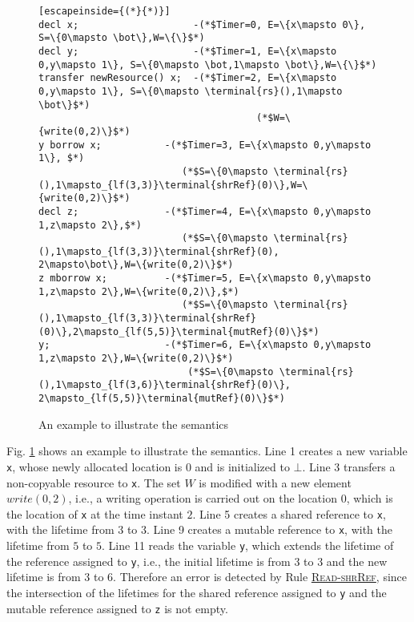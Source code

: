 \documentclass[runningheads]{llncs}
\def\refrule#1{\hyperref[#1]{\textsc{#1}}}
\def\codec#1{\texttt{#1}}
\newcommand{\terminal}[1]{\textbf{#1}}
\let\othelstnumber=\thelstnumber
\def\createlinenumber#1#2{
	\edef\thelstnumber{%
		\unexpanded{%
			\ifnum#1=\value{lstnumber}\relax
			#2%
			\else}%
		\expandafter\unexpanded\expandafter{\thelstnumber\othelstnumber\fi}%
	}
	\ifx\othelstnumber=\relax\else
	\let\othelstnumber\relax
	\fi
}
\begin{document}
\begin{figure}
	\vspace{-0.5cm}
\begin{lstlisting}[escapeinside={(*}{*)}]
decl x;                    -(*$Timer=0, E=\{x\mapsto 0\}, S=\{0\mapsto \bot\},W=\{\}$*)
decl y;	                   -(*$Timer=1, E=\{x\mapsto 0,y\mapsto 1\}, S=\{0\mapsto \bot,1\mapsto \bot\},W=\{\}$*)
transfer newResource() x;  -(*$Timer=2, E=\{x\mapsto 0,y\mapsto 1\}, S=\{0\mapsto \terminal{rs}(),1\mapsto \bot\}$*) 	 
                                      (*$W=\{write(0,2)\}$*)
y borrow x;           -(*$Timer=3, E=\{x\mapsto 0,y\mapsto 1\}, $*)
                         (*$S=\{0\mapsto \terminal{rs}(),1\mapsto_{lf(3,3)}\terminal{shrRef}(0)\},W=\{write(0,2)\}$*)
decl z;               -(*$Timer=4, E=\{x\mapsto 0,y\mapsto 1,z\mapsto 2\},$*) 
                         (*$S=\{0\mapsto \terminal{rs}(),1\mapsto_{lf(3,3)}\terminal{shrRef}(0), 2\mapsto\bot\},W=\{write(0,2)\}$*)
z mborrow x;          -(*$Timer=5, E=\{x\mapsto 0,y\mapsto 1,z\mapsto 2\},W=\{write(0,2)\},$*) 
                         (*$S=\{0\mapsto \terminal{rs}(),1\mapsto_{lf(3,3)}\terminal{shrRef}(0)\},2\mapsto_{lf(5,5)}\terminal{mutRef}(0)\}$*)
y;                    -(*$Timer=6, E=\{x\mapsto 0,y\mapsto 1,z\mapsto 2\},W=\{write(0,2)\}$*) 
                          (*$S=\{0\mapsto \terminal{rs}(),1\mapsto_{lf(3,6)}\terminal{shrRef}(0)\}, 2\mapsto_{lf(5,5)}\terminal{mutRef}(0)\}$*)
\end{lstlisting}
\caption{An example to illustrate the semantics}
\label{fig:exampleborrow}
\vspace{-0.5cm}
\end{figure}

Fig. \ref{fig:exampleborrow} shows an example to illustrate the semantics.
Line 1 creates a new variable \codec{x}, whose newly allocated location is $0$ and is initialized to $\bot$.
Line 3 transfers a non-copyable resource to \codec{x}. The set $W$ is modified with a new element $write(0,2)$, i.e.,
a writing operation is carried out on the location $0$, which is the location of \codec{x} at the time instant $2$.
Line 5 creates a shared reference to \codec{x}, with the lifetime from $3$ to $3$.
Line 9 creates a mutable reference to \codec{x}, with the lifetime from $5$ to $5$.
Line 11 reads the variable \codec{y}, which extends the lifetime of the reference assigned to \codec{y}, i.e., the initial
lifetime is from 3 to 3 and the new lifetime is from 3 to 6.
Therefore an error is detected by Rule \refrule{Read-shrRef}, since the intersection of the lifetimes for the shared reference assigned to \codec{y} and the mutable reference assigned to \codec{z} is not empty. %
\end{document}
